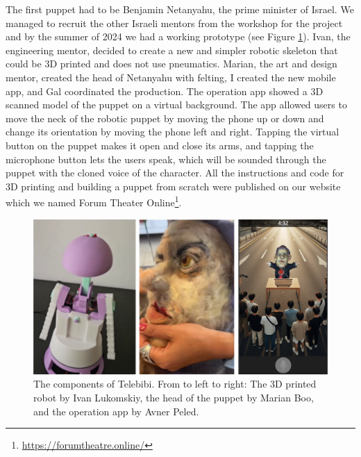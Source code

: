 \documentclass[dissertation,math,vertlayout,pdfa,colorlinks,nologo]{aaltoseries}
\begin{document}
The first puppet had to be Benjamin Netanyahu, the prime minister of Israel. We managed to recruit the other Israeli mentors from the workshop for the project and by the summer of 2024 we had a working prototype (see Figure \ref{fig:telebibi-making}). Ivan, the engineering mentor, decided to create a new and simpler robotic skeleton that could be 3D printed and does not use pneumatics. Marian, the art and design mentor, created the head of Netanyahu with felting, I created the new mobile app, and Gal coordinated the production. The operation app showed a 3D scanned model of the puppet on a virtual background. The app allowed users to move the neck of the robotic puppet by moving the phone up or down and change its orientation by moving the phone left and right. Tapping the virtual button on the puppet makes it open and close its arms, and tapping the microphone button lets the users speak, which will be sounded through the puppet with the cloned voice of the character. All the instructions and code for 3D printing and building a puppet from scratch were published on our website which we named Forum Theater Online\footnote{\url{https://forumtheatre.online/}}.

\begin{figure}
    \includegraphics[width=1\linewidth]{telebibi-making.png}
    \caption{The components of Telebibi. From to left to right: The 3D printed robot by Ivan Lukomskiy, the head of the puppet by Marian Boo, and the operation app by Avner Peled.}
    \label{fig:telebibi-making}
\end{figure}
\end{document}
